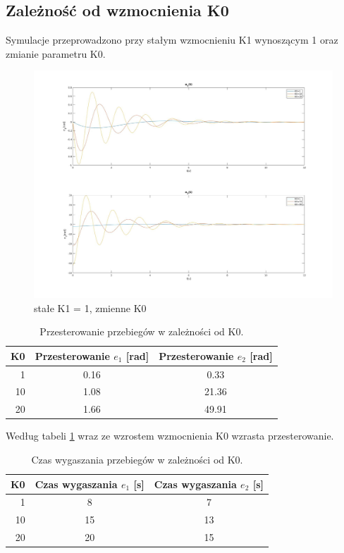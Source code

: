 \documentclass[12pt,a4paper]{article}
\begin{document}
  \subsection{Zależność od wzmocnienia K0}
    Symulacje przeprowadzono przy stałym wzmocnieniu K1 wynoszącym 1 oraz zmianie parametru K0.

    \begin{figure}[H]
      \centering
      \includegraphics[width=1\textwidth]{figures/lin1.jpg}
      \caption{stałe K1 = 1, zmienne K0}
      \label{fig:lin1}
    \end{figure}

    \begin{table}[h!]
      \centering
      \begin{tabular}{ r | c | c }
        K0 & Przesterowanie $e_1$ [rad] & Przesterowanie $e_2$ [rad] \\ 
        \hline
        1 & 0.16 & 0.33  \\
        10 & 1.08 & 21.36   \\
        20 & 1.66 & 49.91
      \end{tabular}
      \caption{Przesterowanie przebiegów w zależności od K0.}
      \label{table:2}
    \end{table}

      Według tabeli \ref{table:2} wraz ze wzrostem wzmocnienia K0 wzrasta przesterowanie.

    \begin{table}[h!]
      \centering
      \begin{tabular}{ r | c | c }
        K0 & Czas wygaszania $e_1$ [s] & Czas wygaszania $e_2$ [s]  \\ 
        \hline
        1  &  8 & 7 \\
        10 & 15 & 13  \\
        20 & 20 & 15
      \end{tabular}
      \caption{Czas wygaszania przebiegów w zależności od K0.}
      \label{table:3}
    \end{table}
\end{document}
